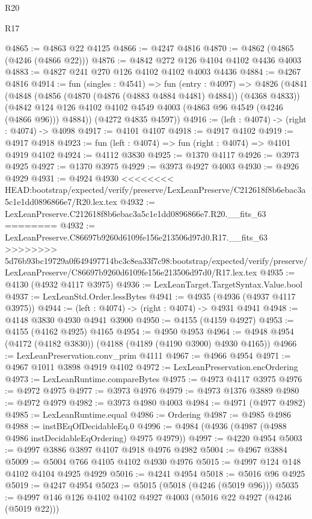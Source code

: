 \begin{lexlean}{R20}
\begin{lexlean}{R17}
\begin{coremodule}
{{{{{{{{{{{{{{{{{{{{{{{{{{{{{{{{{{{{{{{{{{{{{{{{{{{{{{{{{{{{{{{{{{{{{{{{{{{{{{{{{{{{{{{{{{{{{{{{{{{{{{{{{{{@4865 := @4863 @22 @4125
@4866 := @4247 @4816
@4870 := @4862 (@4865 (@4246 (@4866 @22)))
@4876 := @4842 @272 @126 @4104 @4102 @4436 @4003
@4883 := @4827 @241 @270 @126 @4102 @4102 @4003 @4436
@4884 := @4267 @4816
@4914 := fun (singles : @4541) =>
  fun (entry : @4097) =>
  @4826
    (@4841
      (@4848
        (@4856 (@4870 (@4876 (@4883 @4884 @4481) @4884)) (@4368 @4833))
        (@4842 @124 @126 @4102 @4102 @4549 @4003 (@4863 @96 @4549 (@4246 (@4866 @96))) @4884))
      (@4272 @4835 @4597))
@4916 := (left : @4074) -> (right : @4074) -> @4098
@4917 := @4101 @4107
@4918 := @4917 @4102
@4919 := @4917 @4918
@4923 := fun (left : @4074) => fun (right : @4074) => @4101 @4919 @4102
@4924 := @4112 @3830
@4925 := @1370 @4117
@4926 := @3973 @4925
@4927 := @1370 @3975
@4929 := @3973 @4927 @4003
@4930 := @4926 @4929
@4931 := @4924 @4930
<<<<<<<< HEAD:bootstrap/expected/verify/preserve/LexLeanPreserve/C212618f8b6ebac3a5c1e1dd0896866e7/R20.lex.tex
@4932 := LexLeanPreserve.C212618f8b6ebac3a5c1e1dd0896866e7.R20.__fits_63
========
@4932 := LexLeanPreserve.C86697b9260d6109fe156e213506d97d0.R17.__fits_63
>>>>>>>> 5d76b93bc19729a0f649497714bc3c8ea33f7c98:bootstrap/expected/verify/preserve/LexLeanPreserve/C86697b9260d6109fe156e213506d97d0/R17.lex.tex
@4935 := @4130 (@4932 @4117 @3975)
@4936 := LexLeanTarget.TargetSyntax.Value.bool
@4937 := LexLeanStd.Order.lessBytes
@4941 := @4935 (@4936 (@4937 @4117 @3975))
@4944 := (left : @4074) -> (right : @4074) -> @4931 @4941
@4948 := @4148 @3830 @4930 @4941 @3900
@4950 := @4155 (@4159 @4927)
@4953 := @4155 (@4162 @4925) @4165
@4954 := @4950 @4953
@4964 := @4948 @4954 (@4172 (@4182 @3830)) (@4188 (@4189 (@4190 @3900) @4930 @4165))
@4966 := LexLeanPreservation.conv_prim @4111
@4967 := @4966 @4954
@4971 := @4967 @1011 @3898 @4919 @4102
@4972 := LexLeanPreservation.encOrdering
@4973 := LexLeanRuntime.compareBytes
@4975 := @4973 @4117 @3975
@4976 := @4972 @4975
@4977 := @3973 @4976
@4979 := @4973 @1376 @3889
@4980 := @4972 @4979
@4982 := @3973 @4980 @4003
@4984 := @4971 (@4977 @4982)
@4985 := LexLeanRuntime.equal
@4986 := Ordering
@4987 := @4985 @4986
@4988 := instBEqOfDecidableEq.{0}
@4996 := @4984 (@4936 (@4987 (@4988 @4986 instDecidableEqOrdering) @4975 @4979))
@4997 := @4220 @4954
@5003 := @4997 @3886 @3897 @4107 @4918 @4976 @4982
@5004 := @4967 @3884
@5009 := @5004 @766 @4105 @4102 @4930 @4976
@5015 := @4997 @124 @148 @4102 @4104 @4925 @4929
@5016 := @4241 @4954
@5018 := @5016 @96 @4925
@5019 := @4247 @4954
@5023 := @5015 (@5018 (@4246 (@5019 @96)))
@5035 := @4997 @146 @126 @4102 @4102 @4927 @4003 (@5016 @22 @4927 (@4246 (@5019 @22)))
}}}}}}}}}}}}}}}}}}}}}}}}}}}}}}}}}}}}}}}}}}}}}}}}}}}}}}}}}}}}}}}}}}}}}}}}}}}}}}}}}}}}}}}}}}}}}}}}}}}}}}}}}}}
\end{coremodule}
\end{lexlean}
\end{lexlean}
